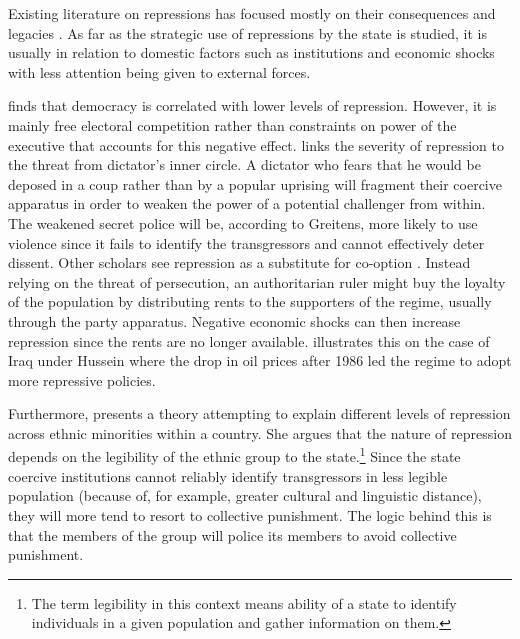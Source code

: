 Existing literature on repressions has focused mostly on their consequences and legacies \citep{rozenas_political_2017, lupu_legacy_2017, zhukov_stalins_2018}. As far as the strategic use of repressions by the state is studied, it is usually in relation to domestic factors such as institutions and economic shocks \citep{davenport_state_2007, greitens_dictators_2016, blaydes_state_2018} with less attention being given to external forces. 

\citet{davenport_state_2007} finds that democracy is correlated with lower levels of repression. However, it is mainly free electoral competition rather than constraints on power of the executive that accounts for this negative effect.  
\citet{greitens_dictators_2016} links the severity of repression to the threat from dictator's inner circle. A dictator who fears that he would be deposed in a coup rather than by a popular uprising will fragment their coercive apparatus in order to weaken the power of a potential challenger from within. The weakened secret police will be, according to Greitens, more likely to use violence since it fails to identify the transgressors and cannot effectively deter dissent. 
Other scholars see repression as a substitute for co-option \citep{wintrobe_political_1998, svolik_politics_2012}. Instead relying on the threat of persecution, an authoritarian ruler might buy the loyalty of the population by distributing rents to the supporters of the regime, usually through the party apparatus. Negative economic shocks can then increase repression since the rents are no longer available.  \citet{blaydes_state_2018} 
illustrates this on the case of Iraq under Hussein where the drop in  oil prices after 1986 led the regime to adopt more repressive policies.  

Furthermore, \citet{blaydes_state_2018} presents a theory attempting to explain different levels of repression across ethnic minorities within a country. She argues that the nature of repression  depends on the legibility of the ethnic group to the state.\footnote{The term legibility in this context means ability of a state to identify individuals in a given population and gather information on them.}
 Since the state coercive institutions cannot reliably identify transgressors in  less legible population (because of, for example, greater cultural and linguistic distance), they will more tend to resort to collective punishment. The logic behind this is that the members of the group will police its members to avoid collective punishment. 

